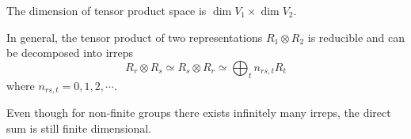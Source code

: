 \documentclass[a4paper,11pt]{article}
\begin{document}
	The dimension of tensor product space is $\dim V_1 \times \dim V_2$.

	\begin{prop}
		In general, the tensor product of two representations $R_1 \otimes R_2$ is reducible and can be decomposed into irreps
		\begin{equation}
			R_r \otimes R_s \simeq R_s \otimes R_r \simeq \bigoplus_t n _{rs,t} R_t
			\label{eq:2.2.2}
		\end{equation}
		where $n _{rs,t} = 0,1,2,\cdots$.

		Even though for non-finite groups there exists infinitely many irreps, the direct sum is still finite dimensional.
	\end{prop}
\end{document}
